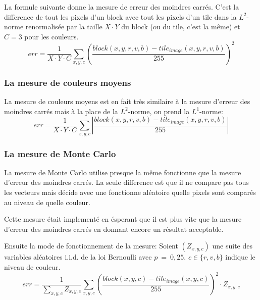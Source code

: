 \documentclass[a4paper]{article}
\begin{document}
La formule suivante donne la mesure de erreur des moindres carr\'es.
C'est la difference de tout les pixels d'un block avec tout les pixels d'un tile dans la $L^2$-norme renormalis\'ee par la taille $X\cdot Y$ du block (ou du tile, c'est la m\^eme) et $C=3$ pour les couleurs. 
\begin{equation}
err=\frac{1}{X\cdot Y\cdot C}\sum_{x,y,c}\left(\frac{block(x,y,r,v,b)-tile_{image}(x,y,r,v,b)}{255}\right)^2
\end{equation}
 
\subsubsection{La mesure de couleurs moyens}
La mesure de couleurs moyens est en fait tr\`es similaire \`a la mesure d'erreur des moindres carr\'es mais \`a la place de la $L^2$-norme, on prend la $L^1$-norme:
\begin{equation}
err=\frac{1}{X\cdot Y\cdot C}\sum_{x,y,c}\left|\frac{block(x,y,r,v,b)-tile_{image}(x,y,r,v,b)}{255}\right|
\end{equation}

\subsubsection{La mesure de Monte Carlo}
La mesure de Monte Carlo utilise presque la m\^eme fonctionne que la mesure d'erreur des moindres carr\'es.
La seule difference est que il ne compare pas tous les vecteurs mais d\'ecide avec une fonctionne al\'eatoire quelle pixels sont compar\'es au niveau de quelle couleur.

Cette mesure \'etait implement\'e en \'esperant que il est plus vite que la mesure d'erreur des moindres carr\'es en donnant encore un r\'esultat acceptable.

Ensuite la mode de fonctionnement de la mesure:
Soient $(Z_{x,y,c})$ une suite des variables al\'eatoires i.i.d. de la loi Bernoulli avec $p~=~0,25$.
$c\in \{r,v,b\}$ indique le niveau de couleur.
\begin{equation}
err=\frac{1}{\sum_{x,y,c}Z_{x,y,c}}\sum_{x,y,c}\left(\frac{block(x,y,c)-tile_{image}(x,y,c)}{255}\right)^2\cdot Z_{x,y,c}
\end{equation}
\end{document}

